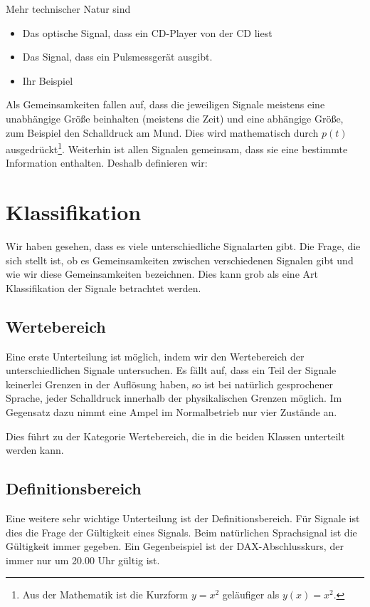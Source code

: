 Mehr technischer Natur sind \zB
\begin{itemize}
    \item Das optische Signal, dass ein CD-Player von der CD liest
    \item Das Signal, dass ein Pulsmessgerät ausgibt.
    \item Ihr Beispiel
\end{itemize}

Als Gemeinsamkeiten fallen auf, dass die jeweiligen Signale meistens eine
unabhängige Größe beinhalten (meistens die Zeit) und eine abhängige Größe, zum Beispiel
den Schalldruck am Mund. Dies wird mathematisch durch $p(t)$ ausgedrückt\footnote{Aus
der Mathematik ist die Kurzform $y = x^2$ geläufiger als $y(x) = x^2$.}.
Weiterhin ist allen Signalen gemeinsam, dass sie
eine bestimmte Information enthalten.
Deshalb definieren wir:

\section{Klassifikation}
Wir haben gesehen, dass es viele unterschiedliche Signalarten gibt. Die Frage, die sich
stellt ist, ob es Gemeinsamkeiten zwischen verschiedenen Signalen gibt und
wie wir diese Gemeinsamkeiten bezeichnen. Dies kann grob als eine Art Klassifikation der
Signale betrachtet werden.

\subsection{Wertebereich}
Eine erste Unterteilung ist möglich, indem wir den Wertebereich der unterschiedlichen
Signale untersuchen. Es fällt auf, dass ein Teil der Signale keinerlei Grenzen
in der Auflösung haben, so ist bei natürlich gesprochener Sprache, jeder Schalldruck
innerhalb der physikalischen Grenzen
möglich. Im Gegensatz dazu nimmt eine Ampel im Normalbetrieb nur vier Zustände an.

Dies führt zu der Kategorie Wertebereich, die in die beiden Klassen
unterteilt werden kann.

\subsection{Definitionsbereich}
Eine weitere sehr wichtige Unterteilung ist der Definitionsbereich. Für Signale
ist dies die Frage der Gültigkeit eines Signals. Beim natürlichen Sprachsignal ist die Gültigkeit
immer gegeben. Ein Gegenbeispiel ist der DAX-Abschlusskurs, der immer nur
um 20.00 Uhr gültig ist.

